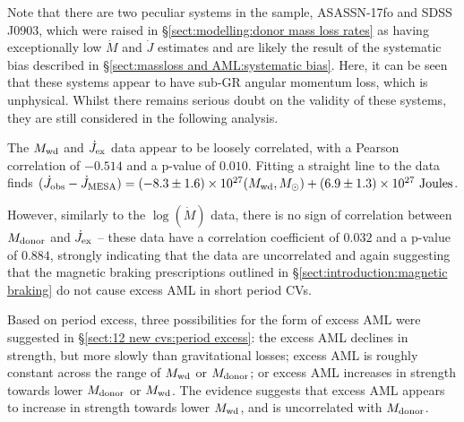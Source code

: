 Note that there are two peculiar systems in the sample, ASASSN-17fo and SDSS J0903, which were raised in \S\ref{sect:modelling:donor mass loss rates} as having exceptionally low $\dot M$ and $\dot J$ estimates and are likely the result of the systematic bias described in \S\ref{sect:massloss and AML:systematic bias}. Here, it can be seen that these systems appear to have sub-GR angular momentum loss, which is unphysical. Whilst there remains serious doubt on the validity of these systems, they are still considered in the following analysis.

The $M_{\rm wd}$ and $\dot J_{\rm ex}$ data appear to be loosely correlated, with a Pearson correlation of $-0.514$ and a p-value of $0.010$. Fitting a straight line to the data finds $(\dot J_{\rm obs} - \dot J_{\rm MESA}) = (-8.3\pm1.6) \times 10^{27}(M_{\rm wd}, M_\odot) + (6.9\pm1.3)\times10^{27}~{\rm Joules}$.

However, similarly to the $\log (\dot M)$ data, there is no sign of correlation between $M_{\rm donor}$ and $\dot J_{\rm ex}$ -- these data have a correlation coefficient of $0.032$ and a p-value of $0.884$, strongly indicating that the data are uncorrelated and again suggesting that the magnetic braking prescriptions outlined in \S\ref{sect:introduction:magnetic braking} do not cause excess AML in short period CVs.

Based on period excess, three possibilities for the form of excess AML were suggested in \S\ref{sect:12 new cvs:period excess}: the excess AML declines in strength, but more slowly than gravitational losses; excess AML is roughly constant across the range of $M_{\rm wd}$ or $M_{\rm donor}$; or excess AML increases in strength towards lower $M_{\rm donor}$ or $M_{\rm wd}$.
The evidence suggests that excess AML appears to increase in strength towards lower $M_{\rm wd}$, and is uncorrelated with $M_{\rm donor}$.


